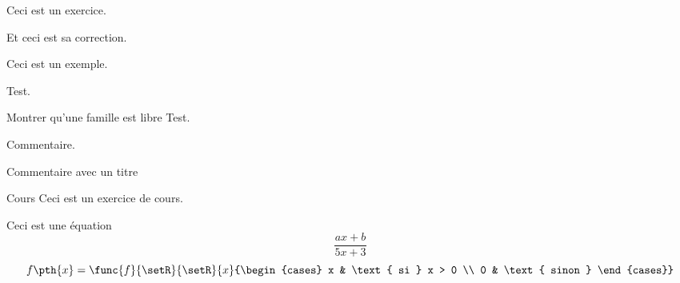     \begin{latexcode}
        \begin{exercise}{}{}
            Ceci est un exercice.
        \end{exercise}
    \end{latexcode}

    \begin{latexcode}
        \begin{correction}
            Et ceci est sa correction.
        \end{correction}
    \end{latexcode}

    \begin{latexcode}
        \begin{example}{}{}
            Ceci est un exemple.
        \end{example}
    \end{latexcode}

    \begin{latexcode}
        \begin{remark}{}{}
            Test.
        \end{remark}
    \end{latexcode}

    \begin{latexcode}
        \begin{method}{Montrer qu'une famille est libre}{}
            Test.
        \end{method}
    \end{latexcode}

    \begin{latexcode}
        \begin{note}
            Commentaire.
        \end{note}
    \end{latexcode}

    \begin{latexcode}
        \begin{note}[Note]
            Commentaire avec un titre
        \end{note}
    \end{latexcode}

    \begin{latexcode}
        \begin{subject}{}{}
            \begin{subjectexercise}{Cours}{}
                Ceci est un exercice de cours.
            \end{subjectexercise}
        \end{subject}
    \end{latexcode}


    \begin{theorem}{}{}
        Ceci est une équation $$\frac{ax + b}{5x + 3}$$ $$f \pth{x} = \func{f}{\setR}{\setR}{x}{\begin{cases}
            x & \text{ si } x > 0 \\
            0 & \text{ sinon }
        \end{cases}}$$
    \end{theorem}